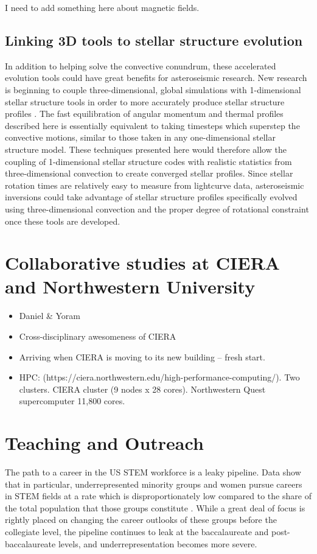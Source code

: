 \documentclass[aasms,12pt]{article}
\begin{document}
I need to add something here about magnetic fields.

\subsection{Linking 3D tools to stellar structure evolution}

In addition to helping solve the convective conundrum, these accelerated evolution tools could have great benefits for asteroseismic research.
New research is beginning to couple three-dimensional, global simulations with 1-dimensional stellar structure tools in order to more accurately produce stellar structure profiles \citep{jorgensen&weiss2019}.
The fast equilibration of angular momentum and thermal profiles described here is essentially equivalent to taking timesteps which superstep the convective motions, similar to those taken in any one-dimensional stellar structure model.
These techniques presented here would therefore allow the coupling of 1-dimensional stellar structure codes with realistic statistics from three-dimensional convection to create converged stellar profiles.
Since stellar rotation times are relatively easy to measure from lightcurve data, asteroseismic inversions could take advantage of stellar structure profiles specifically evolved using three-dimensional convection and the proper degree of rotational constraint once these tools are developed.

\section{Collaborative studies at CIERA and Northwestern University}
\label{sct:northwestern}
\begin{itemize}
\item Daniel \& Yoram
\item Cross-disciplinary awesomeness of CIERA %
\item Arriving when CIERA is moving to its new building -- fresh start.
\item HPC: (https://ciera.northwestern.edu/high-performance-computing/). Two clusters. CIERA cluster (9 nodes x 28 cores). Northwestern Quest supercomputer 11,800 cores.
\end{itemize}


\section{Teaching and Outreach}
\label{sct:outreach}
The path to a career in the US STEM workforce is a leaky pipeline.
Data show that in particular, underrepresented minority groups and women pursue careers in STEM fields at a rate which is disproportionately low compared to the share of the total population that those groups constitute \citep{corbett&hill2015, nsf2019}.
While a great deal of focus is rightly placed on changing the career outlooks of these groups before the collegiate level, the pipeline continues to leak at the baccalaureate and post-baccalaureate levels, and underrepresentation becomes more severe.
\end{document}
